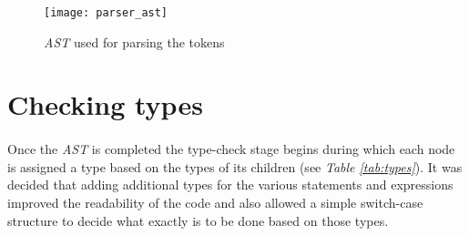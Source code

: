 	\begin{figure}
    		\centering
    		\label{fig:ast}
    		\texttt{[image: parser\_ast]}
    		\caption{\textit{AST} used for parsing the tokens}
    \end{figure}
    
    \section{Checking types}
    \paragraph{}
    		Once the \textit{AST} is completed the type-check stage begins during which each node is assigned a type based on the types of its children (see \textit{Table \ref{tab:types}}). It was decided that adding additional types for the various statements and expressions improved the readability of the code and also allowed a simple switch-case structure to decide what exactly is to be done based on those types.
    		
